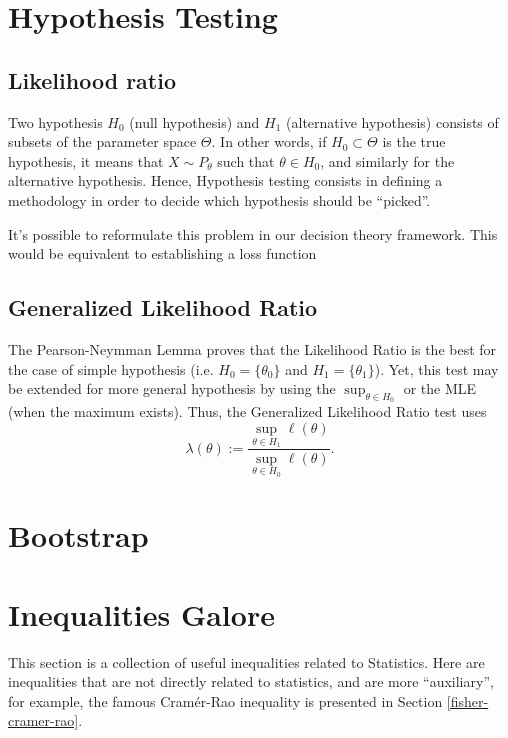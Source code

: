 \section{Hypothesis Testing}

\subsection{Likelihood ratio}
Two hypothesis $H_0$ (null hypothesis) and $H_1$ (alternative hypothesis)
consists of subsets of the parameter space $\Theta$. In other words,
if $H_0 \subset \Theta$ is the true hypothesis, it means that
$X \sim P_\theta$ such that $\theta \in H_0$, and similarly for the alternative
hypothesis. Hence, Hypothesis testing consists in defining a methodology
in order to decide which hypothesis should be ``picked''.

It's possible to reformulate this problem in our decision theory
framework. This would be equivalent to establishing a loss function

\subsection{Generalized Likelihood Ratio}

The Pearson-Neymman Lemma proves that the Likelihood Ratio
is the best for the case of simple hypothesis
(i.e. $H_0 = \{\theta_0\}$ and $H_1 =\{\theta_1\}$).
Yet, this test may be extended for more general hypothesis
by using the $\sup_{\theta \in H_0}$ or the MLE (when
the maximum exists). Thus, the Generalized Likelihood Ratio test
uses
\begin{equation}
	\lambda(\theta) := \frac{\sup_{\theta \in H_1} \ell(\theta)}{\sup_{\theta \in H_0} \ell(\theta)}.
	\label{eq:GenearlizedLikelihood}
\end{equation}


\section{Bootstrap}


\section{Inequalities Galore}

This section is a collection of useful inequalities related to Statistics. Here are
inequalities that are not directly related to statistics, and are more ``auxiliary'',
for example, the famous Cramér-Rao inequality is presented in Section \ref{fisher-cramer-rao}.


